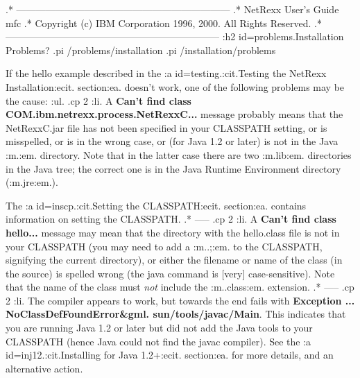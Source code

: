 .* ------------------------------------------------------------------
.* NetRexx User's Guide                                              mfc
.* Copyright (c) IBM Corporation 1996, 2000.  All Rights Reserved.
.* ------------------------------------------------------------------
:h2 id=problems.Installation Problems?
.pi /problems/installation
.pi /installation/problems

If the hello example described in the :a id=testing.:cit.Testing
the NetRexx Installation:ecit. section:ea. doesn't work, one of the
following problems may be the cause:
:ul.
.cp 2
:li.
A \textbf{Can't find class COM.ibm.netrexx.process.NetRexxC...} message
probably means that the NetRexxC.jar file has not been specified in your
CLASSPATH setting, or is misspelled, or is in the wrong case, or (for
Java 1.2 or later) is not in the Java :m.\lib\ext:em. directory.  Note
that in the latter case there are two :m.lib:em. directories in the Java
tree; the correct one is in the Java Runtime Environment directory
(:m.jre:em.).

The :a id=inscp.:cit.Setting the CLASSPATH:ecit. section:ea. contains
information on setting the CLASSPATH.
.* -----
.cp 2
:li.
A \textbf{Can't find class hello...} message may mean that the directory
with the hello.class file is not in your CLASSPATH (you may need to
add a :m..;:em. to the CLASSPATH, signifying the current
directory), or either the filename or name of the class (in the source)
is spelled wrong (the java command is [very] case-sensitive).  Note that
the name of the class must \emph{not} include the :m..class:em.
extension.
.* -----
.cp 2
:li.
The compiler appears to work, but towards the end fails with
\textbf{Exception ... NoClassDefFoundError&gml. sun/tools/javac/Main}.
This indicates that you are running Java 1.2 or later but did not add
the Java tools to your CLASSPATH (hence Java could not find the javac
compiler).  See the :a id=inj12.:cit.Installing for Java 1.2+:ecit.
section:ea. for more details, and an alternative action.

